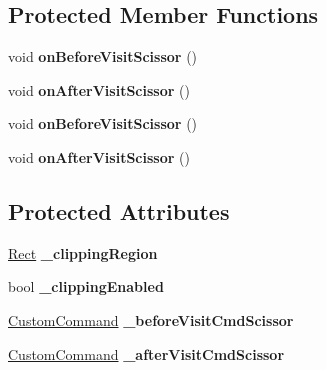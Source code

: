 \subsection*{Protected Member Functions}
\begin{DoxyCompactItemize}
\item 
\mbox{\label{classClippingRectangleNode_ac0b4822fbaf7c950b03e97b001bda744}} 
void {\bfseries on\+Before\+Visit\+Scissor} ()
\item 
\mbox{\label{classClippingRectangleNode_a2063edfd1ce71302b211a1afb06a9ade}} 
void {\bfseries on\+After\+Visit\+Scissor} ()
\item 
\mbox{\label{classClippingRectangleNode_ac0b4822fbaf7c950b03e97b001bda744}} 
void {\bfseries on\+Before\+Visit\+Scissor} ()
\item 
\mbox{\label{classClippingRectangleNode_a2063edfd1ce71302b211a1afb06a9ade}} 
void {\bfseries on\+After\+Visit\+Scissor} ()
\end{DoxyCompactItemize}
\subsection*{Protected Attributes}
\begin{DoxyCompactItemize}
\item 
\mbox{\label{classClippingRectangleNode_ae8098ce0bdaaadef48634d60596f91aa}} 
\hyperlink{classRect}{Rect} {\bfseries \+\_\+clipping\+Region}
\item 
\mbox{\label{classClippingRectangleNode_ac6f23481947f8d66d1201ee2fb872fa5}} 
bool {\bfseries \+\_\+clipping\+Enabled}
\item 
\mbox{\label{classClippingRectangleNode_a3f0e27d5d74f258f37579132c3a12c04}} 
\hyperlink{classCustomCommand}{Custom\+Command} {\bfseries \+\_\+before\+Visit\+Cmd\+Scissor}
\item 
\mbox{\label{classClippingRectangleNode_a20551f7a5b72c04f4f7ea951e7f7cedd}} 
\hyperlink{classCustomCommand}{Custom\+Command} {\bfseries \+\_\+after\+Visit\+Cmd\+Scissor}
\end{DoxyCompactItemize}
